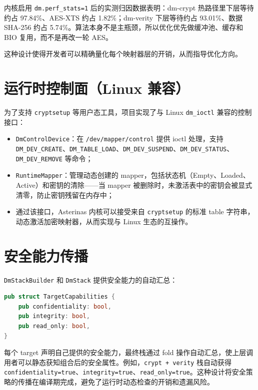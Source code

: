 内核启用 \texttt{dm.perf\_stats=1} 后的实测归因数据表明：dm-crypt 热路径里下层等待约占 97.84\%、AES-XTS 约占 1.82\%；dm-verity 下层等待约占 93.01\%、数据 SHA-256 约占 5.74\%。算法本身不是主瓶颈，所以优化优先做缓冲池、缓存和 BIO 复用，而不是再改一轮 AES。

这种设计使得开发者可以精确量化每个映射器层的开销，从而指导优化方向。

\section{运行时控制面（Linux 兼容）}

为了支持 \texttt{cryptsetup} 等用户态工具，项目实现了与 Linux \texttt{dm\_ioctl} 兼容的控制接口：

\begin{itemize}
    \item \texttt{DmControlDevice}：在 \texttt{/dev/mapper/control} 提供 ioctl 处理，支持 \texttt{DM\_DEV\_CREATE}、\texttt{DM\_TABLE\_LOAD}、\texttt{DM\_DEV\_SUSPEND}、\texttt{DM\_DEV\_STATUS}、\texttt{DM\_DEV\_REMOVE} 等命令；
    \item \texttt{RuntimeMapper}：管理动态创建的 mapper，包括状态机（Empty、Loaded、Active）和密钥的清除——当 mapper 被删除时，未激活表中的密钥会被显式清零，防止密钥残留在内存中；
    \item 通过该接口，Asterinas 内核可以接受来自 \texttt{cryptsetup} 的标准 table 字符串，动态激活加密映射器，从而实现与 Linux 生态的互操作。
\end{itemize}

\section{安全能力传播}

\texttt{DmStackBuilder} 和 \texttt{DmStack} 提供安全能力的自动汇总：

\begin{lstlisting}[language=Rust, basicstyle=\ttfamily\small, breaklines=true]
pub struct TargetCapabilities {
    pub confidentiality: bool,
    pub integrity: bool,
    pub read_only: bool,
}
\end{lstlisting}

每个 target 声明自己提供的安全能力，最终栈通过 fold 操作自动汇总，使上层调用者可以静态获知组合后的安全属性。例如，\texttt{crypt + verity} 栈自动获得 \texttt{confidentiality=true}、\texttt{integrity=true}、\texttt{read\_only=true}。这种设计将安全策略的传播在编译期完成，避免了运行时动态检查的开销和遗漏风险。

